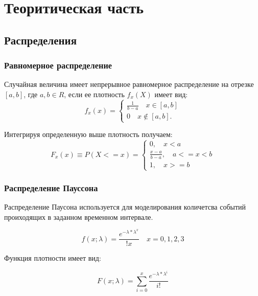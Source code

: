 \section{Теоритическая часть}

\subsection{Распределения}

\subsubsection{Равномерное распределение}

Случайная величина имеет непрерывное равномерное распределение на отрезке $[a,b]$, где $a,b \in R $, если ее плотность $f_x(X)$ имеет вид:
\begin{equation}
f_x(x)=\begin{cases}
\frac{1}{b-a} \quad x \in [a,b] \\
0 \quad x \notin [a,b].
\end{cases}
\end{equation}

Интегрируя определенную выше плотность получаем:
\begin{equation}
F_x(x) \equiv P(X <= x) = \begin{cases}
0, \quad x < a \\
\frac{x - a}{b - a}, \quad a <= x < b \\
1, \quad x >= b
\end{cases}
\end{equation}

\subsubsection{Распределение Пауссона}

Распределение Паусона используется для моделирования количетсва событий проиходящих в заданном временном интервале.


\begin{equation}
f(x; \lambda) = \frac{e^{-\lambda * \lambda^x}}{!x} \quad x = 0, 1, 2, 3
\end{equation}

Функция плотности имеет вид:

\begin{equation}
F(x; \lambda) = \sum_{i=0}^{x}\frac{e^{-\lambda * \lambda^i}}{i!} 
\end{equation}

